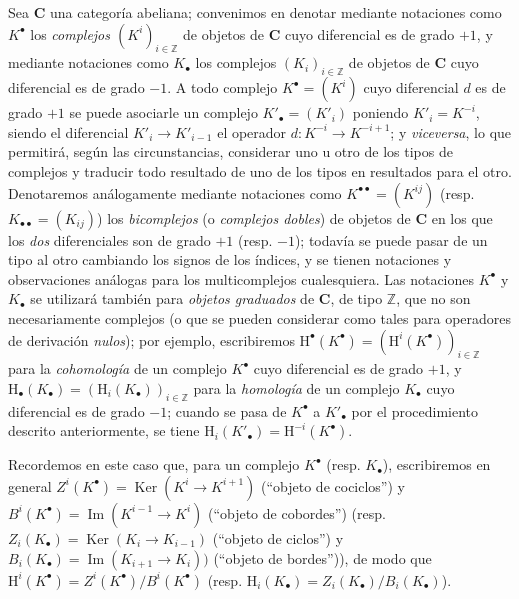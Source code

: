 \begin{env}[11.2.1]
\label{0.11.2.1}
\label{0.11.2.1-fr}
Sea $\boldsymbol{C}$ una categoría abeliana; convenimos en denotar mediante notaciones como $K^\bullet$ los \emph{complejos $(K^i)_{i\in\mathbb Z}$} de objetos de $\boldsymbol{C}$ cuyo diferencial es de grado $+1$, y mediante notaciones como $K_\bullet$ los complejos $(K_i)_{i\in\mathbb Z}$ de objetos de $\boldsymbol{C}$ cuyo diferencial es de grado $-1$.
A todo complejo $K^\bullet=(K^i)$ cuyo diferencial $d$ es de grado $+1$ se puede asociarle un complejo $K'_\bullet=(K'_i)$ poniendo $K'_i=K^{-i}$, siendo el diferencial $K'_i\to K'_{i-1}$ el operador $d:K^{-i}\to K^{-i+1}$; y \emph{viceversa}, lo que permitirá, según las circunstancias, considerar uno u otro de los tipos de complejos y traducir todo resultado de uno de los tipos en resultados para el otro.
Denotaremos análogamente mediante notaciones como $K^{\bullet\bullet}=(K^{ij})$ (resp. $K_{\bullet\bullet}=(K_{ij})$) los \emph{bicomplejos} (o \emph{complejos dobles}) de objetos de $\boldsymbol{C}$ en los que los \emph{dos} diferenciales son de grado $+1$ (resp. $-1$); todavía se puede pasar de un tipo al otro cambiando los signos de los índices, y se tienen notaciones y observaciones análogas para los multicomplejos cualesquiera.
Las notaciones $K^\bullet$ y $K_\bullet$ se utilizará también para \emph{objetos graduados} de $\boldsymbol{C}$, de tipo $\mathbb Z$, que no son necesariamente complejos (o que se pueden considerar como tales para operadores de derivación \emph{nulos}); por ejemplo, escribiremos
$\mathrm H^\bullet(K^\bullet)=(\mathrm H^i(K^\bullet))_{i\in\mathbb Z}$ para la \emph{cohomología} de un complejo $K^\bullet$ cuyo diferencial es de grado $+1$, y $\mathrm H_\bullet(K_\bullet)=(\mathrm H_i(K_\bullet))_{i\in\mathbb Z}$ para la \emph{homología} de un complejo $K_\bullet$ cuyo diferencial es de grado $-1$; cuando se pasa de $K^\bullet$ a $K'_\bullet$ por el procedimiento descrito anteriormente, se tiene $\mathrm H_i(K'_\bullet)=\mathrm H^{-i}(K^\bullet)$.

Recordemos en este caso que, para un complejo $K^\bullet$ (resp. $K_\bullet$), escribiremos en general $Z^i(K^\bullet)=\operatorname{Ker}(K^i\to K^{i+1})$ (``objeto de cociclos'') y $B^i(K^\bullet)=\operatorname{Im}(K^{i-1}\to K^i)$ (``objeto de cobordes'') (resp. $Z_i(K_\bullet)=\operatorname{Ker}(K_i\to K_{i-1})$ (``objeto de ciclos'') y $B_i(K_\bullet)=\operatorname{Im}(K_{i+1}\to K_i))$ (``objeto de bordes'')), de modo que $\mathrm H^i(K^\bullet)=Z^i(K^\bullet)/B^i(K^\bullet)$ (resp. $\mathrm H_i(K_\bullet)=Z_i(K_\bullet)/B_i(K_\bullet)$).


\end{env}
